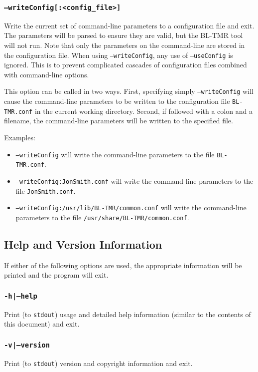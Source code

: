 \documentclass[english]{article}
\begin{document}
\subsubsection{\texttt{--writeConfig[:<config\_file>]}}
Write the current set of command-line parameters to a configuration file and 
exit. The parameters will be parsed to ensure they are valid, but the BL-TMR tool
will not run.  Note that only the parameters on the command-line are stored in
the configuration file. When using \texttt{--writeConfig}, any use of
\texttt{--useConfig} is ignored. This is to prevent complicated cascades
of configuration files combined with command-line options.

This option can be called in two ways. First, specifying simply 
\texttt{--writeConfig} will cause the command-line parameters to be written to 
the configuration file \texttt{BL-TMR.conf} in the current working directory. 
Second, if followed with a colon and a filename, the command-line parameters 
will be written to the specified file. 

Examples:
\begin{itemize}
  \item \texttt{--writeConfig} will write the command-line parameters to the
  file \texttt{BL-TMR.conf}.
  \item \texttt{--writeConfig:JonSmith.conf} will write the command-line 
  parameters to the file \texttt{JonSmith.conf}.
  \item \texttt{--writeConfig:/usr/lib/BL-TMR/common.conf} will write the
  command-line pa\-ram\-e\-ters to the file \texttt{/usr/share/BL-TMR/common.conf}. 
\end{itemize}


\subsection{Help and Version Information}
If either of the following options are used, the appropriate information will be
printed and the program will exit.

\subsubsection{\texttt{-h|--help}}
Print (to \texttt{stdout}) usage and detailed help information (similar to the 
contents of this document) and exit.

\subsubsection{\texttt{-v|--version}}
Print (to \texttt{stdout}) version and copyright information and exit.
\end{document}
